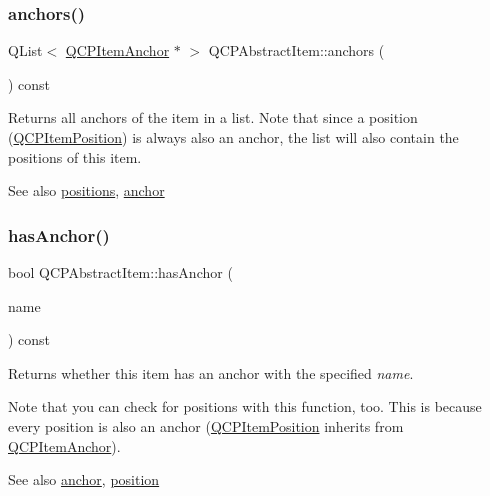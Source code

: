 \subsubsection{\texorpdfstring{anchors()}{anchors()}}
{\footnotesize\ttfamily Q\+List$<$ \hyperlink{class_q_c_p_item_anchor}{Q\+C\+P\+Item\+Anchor} $\ast$ $>$ Q\+C\+P\+Abstract\+Item\+::anchors (\begin{DoxyParamCaption}{ }\end{DoxyParamCaption}) const\hspace{0.3cm}{\ttfamily [inline]}}

Returns all anchors of the item in a list. Note that since a position (\hyperlink{class_q_c_p_item_position}{Q\+C\+P\+Item\+Position}) is always also an anchor, the list will also contain the positions of this item.

\begin{DoxySeeAlso}{See also}
\hyperlink{class_q_c_p_abstract_item_a709f655ac3f7f22d452714134662b454}{positions}, \hyperlink{class_q_c_p_abstract_item_a139c255ea8831642fac91748e29a5adb}{anchor} 
\end{DoxySeeAlso}
\mbox{\label{class_q_c_p_abstract_item_a84914f4516f9b38ef0bd89eafe3dbda7}} 
\subsubsection{\texorpdfstring{has\+Anchor()}{hasAnchor()}}
{\footnotesize\ttfamily bool Q\+C\+P\+Abstract\+Item\+::has\+Anchor (\begin{DoxyParamCaption}\item[{const Q\+String \&}]{name }\end{DoxyParamCaption}) const}

Returns whether this item has an anchor with the specified {\itshape name}.

Note that you can check for positions with this function, too. This is because every position is also an anchor (\hyperlink{class_q_c_p_item_position}{Q\+C\+P\+Item\+Position} inherits from \hyperlink{class_q_c_p_item_anchor}{Q\+C\+P\+Item\+Anchor}).

\begin{DoxySeeAlso}{See also}
\hyperlink{class_q_c_p_abstract_item_a139c255ea8831642fac91748e29a5adb}{anchor}, \hyperlink{class_q_c_p_abstract_item_a2589c3d298f9a576d77d9addb440a18d}{position} 
\end{DoxySeeAlso}
\mbox{\label{class_q_c_p_abstract_item_a2589c3d298f9a576d77d9addb440a18d}} 
